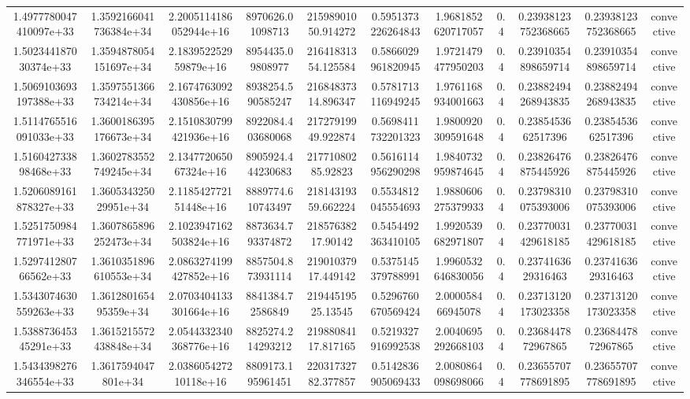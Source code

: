 \begin{table}
\begin{tabular}{ccccccccccc}
1.4977780047410097e+33 & 1.3592166041736384e+34 & 2.2005114186052944e+16 & 8970626.01098713 & 21598901050.914272 & 0.5951373226264843 & 1.9681852620717057 & 0.4 & 0.23938123752368665 & 0.23938123752368665 & convective \\
1.502344187030374e+33 & 1.3594878054151697e+34 & 2.183952252959879e+16 & 8954435.09808977 & 21641831354.125584 & 0.5866029961820945 & 1.9721479477950203 & 0.4 & 0.23910354898659714 & 0.23910354898659714 & convective \\
1.5069103693197388e+33 & 1.3597551366734214e+34 & 2.1674763092430856e+16 & 8938254.590585247 & 21684837314.896347 & 0.5781713116949245 & 1.9761168934001663 & 0.4 & 0.23882494268943835 & 0.23882494268943835 & convective \\
1.5114765516091033e+33 & 1.3600186395176673e+34 & 2.1510830799421936e+16 & 8922084.403680068 & 21727919949.922874 & 0.5698411732201323 & 1.9800920309591648 & 0.4 & 0.2385453662517396 & 0.2385453662517396 & convective \\
1.516042733898468e+33 & 1.3602783552749245e+34 & 2.134772065067324e+16 & 8905924.444230683 & 21771080285.92823 & 0.5616114956290298 & 1.9840732959874645 & 0.4 & 0.23826476875445926 & 0.23826476875445926 & convective \\
1.5206089161878327e+33 & 1.360534325029951e+34 & 2.118542772151448e+16 & 8889774.610743497 & 21814319359.662224 & 0.5534812045554693 & 1.9880606275379933 & 0.4 & 0.23798310075393006 & 0.23798310075393006 & convective \\
1.5251750984771971e+33 & 1.3607865896252473e+34 & 2.1023947162503824e+16 & 8873634.793374872 & 21857638217.90142 & 0.5454492363410105 & 1.9920539682971807 & 0.4 & 0.23770031429618185 & 0.23770031429618185 & convective \\
1.529741280766562e+33 & 1.3610351896610553e+34 & 2.0863274199427852e+16 & 8857504.873931114 & 21901037917.449142 & 0.5375145379788991 & 1.9960532646830056 & 0.4 & 0.2374163629316463 & 0.2374163629316463 & convective \\
1.5343074630559263e+33 & 1.361280165495359e+34 & 2.0703404133301664e+16 & 8841384.72586849 & 21944519525.13545 & 0.5296760670569424 & 2.000058466945078 & 0.4 & 0.23713120173023358 & 0.23713120173023358 & convective \\
1.538873645345291e+33 & 1.3615215572438848e+34 & 2.0544332340368776e+16 & 8825274.214293212 & 21988084117.817165 & 0.5219327916992538 & 2.0040695292668103 & 0.4 & 0.2368447872967865 & 0.2368447872967865 & convective \\
1.5434398276346554e+33 & 1.3617594047801e+34 & 2.038605427210118e+16 & 8809173.195961451 & 22031732782.377857 & 0.5142836905069433 & 2.0080864098698066 & 0.4 & 0.23655707778691895 & 0.23655707778691895 & convective \\

\end{tabular}
\end{table}
